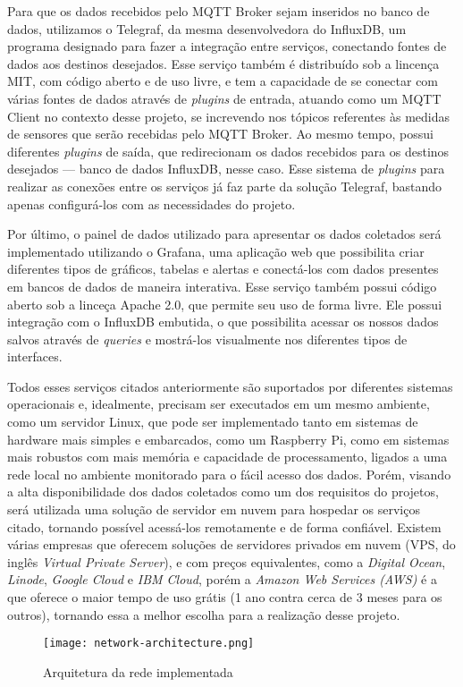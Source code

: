 \documentclass[../monografia.tex]{subfiles}
\begin{document}
Para que os dados recebidos pelo MQTT Broker sejam inseridos no banco de dados, utilizamos o Telegraf, da mesma desenvolvedora do InfluxDB, um programa designado para fazer a integração entre serviços, conectando fontes de dados aos destinos desejados. Esse serviço também é distribuído sob a lincença MIT, com código aberto e de uso livre, e tem a capacidade de se conectar com várias fontes de dados através de \textit{plugins} de entrada, atuando como um MQTT Client no contexto desse projeto, se increvendo nos tópicos referentes às medidas de sensores que serão recebidas pelo MQTT Broker. Ao mesmo tempo, possui diferentes \textit{plugins} de saída, que redirecionam os dados recebidos para os destinos desejados --- banco de dados InfluxDB, nesse caso. Esse sistema de \textit{plugins} para realizar as conexões entre os serviços já faz parte da solução Telegraf, bastando apenas configurá-los com as necessidades do projeto.

Por último, o painel de dados utilizado para apresentar os dados coletados será implementado utilizando o Grafana, uma aplicação web que possibilita criar diferentes tipos de gráficos, tabelas e alertas e conectá-los com dados presentes em bancos de dados de maneira interativa. Esse serviço também possui código aberto sob a linceça Apache 2.0, que permite seu uso de forma livre. Ele possui integração com o InfluxDB embutida, o que possibilita acessar os nossos dados salvos através de \textit{queries} e mostrá-los visualmente nos diferentes tipos de interfaces.



Todos esses serviços citados anteriormente são suportados por diferentes sistemas operacionais e, idealmente, precisam ser executados em um mesmo ambiente, como um servidor Linux, que pode ser implementado tanto em sistemas de hardware mais simples e embarcados, como um Raspberry Pi, como em sistemas mais robustos com mais memória e capacidade de processamento, ligados a uma rede local no ambiente monitorado para o fácil acesso dos dados. Porém, visando a alta disponibilidade dos dados coletados como um dos requisitos do projetos, será utilizada uma solução de servidor em nuvem para hospedar os serviços citado, tornando possível acessá-los remotamente e de forma confiável. Existem várias empresas que oferecem soluções de servidores privados em nuvem (VPS, do inglês \textit{Virtual Private Server}), e com preços equivalentes, como a \textit{Digital Ocean}, \textit{Linode}, \textit{Google Cloud} e \textit{IBM Cloud}, porém a \textit{Amazon Web Services (AWS)} é a que oferece o maior tempo de uso grátis (1 ano contra cerca de 3 meses para os outros), tornando essa a melhor escolha para a realização desse projeto. 


\begin{figure}[h!]
	\centering
	\texttt{[image: network-architecture.png]}
	\caption{Arquitetura da rede implementada}
	\label{fig:network-architecture}
\end{figure}
\end{document}
